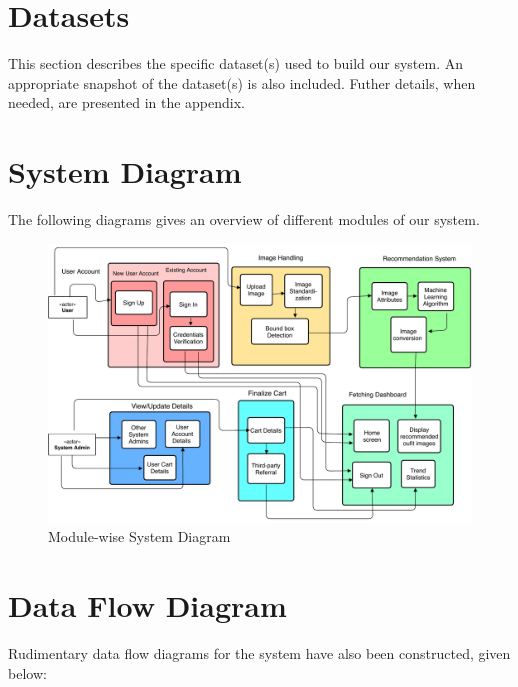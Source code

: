 \section{Datasets}
This section describes the specific dataset(s) used to build our system. An appropriate snapshot of the dataset(s) is also included. Futher details, when needed, are presented in the appendix.

\section{System Diagram}
The following diagrams gives an overview of different modules of our system.

\begin{figure}[ht]
\includegraphics[width=15cm]{images/systemDiagram.pdf} 
\centering
\caption{Module-wise System Diagram}
\end{figure}

\section{Data Flow Diagram}
Rudimentary data flow diagrams for the system have also been constructed, given below:


